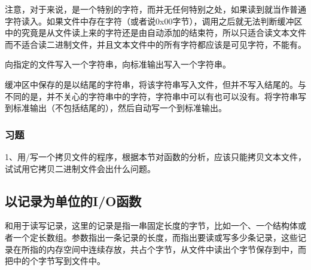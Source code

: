 注意，对于来说，是一个特别的字符，而并无任何特别之处，如果读到就当作普通字符读入。如果文件中存在字符（或者说0x00字节），调用之后就无法判断缓冲区中的究竟是从文件读上来的字符还是由自动添加的结束符，所以只适合读文本文件而不适合读二进制文件，并且文本文件中的所有字符都应该是可见字符，不能有。



向指定的文件写入一个字符串，向标准输出写入一个字符串。




缓冲区中保存的是以结尾的字符串，将该字符串写入文件，但并不写入结尾的。与不同的是，并不关心的字符串中的字符，字符串中可以有也可以没有。将字符串写到标准输出（不包括结尾的），然后自动写一个到标准输出。


\subsubsection*{习题}
%


1、用/写一个拷贝文件的程序，根据本节对函数的分析，应该只能拷贝文本文件，试试用它拷贝二进制文件会出什么问题。


\subsection{以记录为单位的I/O函数}
%



和用于读写记录，这里的记录是指一串固定长度的字节，比如一个、一个结构体或者一个定长数组。参数指出一条记录的长度，而指出要读或写多少条记录，这些记录在所指的内存空间中连续存放，共占个字节，从文件中读出个字节保存到中，而把中的个字节写到文件中。



